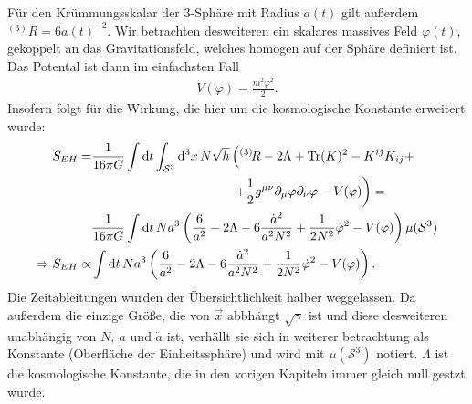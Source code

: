 \documentclass{scrartcl}
\newcommand{\inHS}{{}^{(3)}\!}
\newcommand{\VSthree}{\mu(\mathcal{S}^3)}
\begin{document}
			Für den Krümmungsskalar der 3-Sphäre mit Radius $a(t)$ gilt außerdem $\inHS R=6 a(t)^{-2}$.
			Wir betrachten desweiteren ein skalares massives Feld $\varphi(t)$, gekoppelt an das Gravitationsfeld,
			welches homogen auf der Sphäre definiert ist. Das Potental ist dann im einfachsten Fall
			\begin{align}
				V(\varphi)=\frac{m^2 \varphi^2}{2}.
			\end{align}
			Insofern folgt für die Wirkung, die hier um die kosmologische Konstante erweitert wurde:
			\begin{align}
				S_{EH}=&\frac{1}{16\pi G}\int{\rm d}t\int_{\mathcal{S}^3}{\rm d}^3 x\, N\sqrt{h}\left(\inHS R-2\Lambda+{\rm Tr}(K)^2-K^{ij}K_{ij}+\right.\notag\\
						&\qquad\qquad\qquad\quad\qquad\qquad\left.+\frac{1}{2}g^{\mu\nu}\partial_\mu \varphi\partial_\nu \varphi-V(\varphi)\right)=\notag\\
					&\frac{1}{16\pi G}\int{\rm d}t\, N a^3\left(\frac{6}{a^2}-2\Lambda-6\frac{\dot{a}^2}{a^2N^2}+\frac{1}{2 N^2}\dot{\varphi}^2-V(\varphi)\right) \VSthree\\
					\Rightarrow S_{EH} \propto& \int{\rm d}t\, N a^3\left(\frac{6}{a^2}-2\Lambda-6\frac{\dot{a}^2}{a^2N^2}+\frac{1}{2 N^2}\dot{\varphi}^2-V(\varphi)\right).
			\end{align}
			Die Zeitableitungen wurden der Übersichtlichkeit halber weggelassen. Da außerdem die einzige Größe, die von $\vec{x}$ abbhängt $\sqrt{\gamma}$ ist
			und diese desweiteren unabhängig von $N,\ a$ und $\dot{a}$ ist, verhällt sie sich in weiterer betrachtung als Konstante (Oberfläche der Einheitssphäre) und
			wird mit $\VSthree$ notiert. $\Lambda$ ist die kosmologische Konstante, die in den vorigen Kapiteln immer gleich null gestzt wurde.
			
\end{document}
